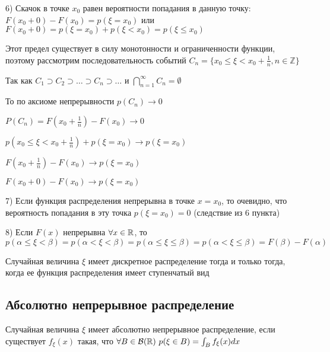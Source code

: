 \documentclass[12pt]{article}
\begin{document}
    6) Скачок в точке $x_0$ равен вероятности попадания в данную точку: $F(x_0 + 0) - F(x_0) = p(\xi = x_0)$ или $F(x_0 + 0) = p(\xi = x_0) + p(\xi < x_0) = p(\xi \leq x_0)$

    
    \begin{MyProof}
        Этот предел существует в силу монотонности и ограниченности функции, поэтому рассмотрим последовательность событий $C_n = \{x_0 \leq \xi < x_0 + \frac{1}{n}, n \in \mathbb{Z}\}$

        Так как $C_1 \supset C_2 \supset \dots \supset C_n \supset \dots$ и $\bigcap_{n = 1}^\infty C_n = \emptyset$

        То по аксиоме непрерывности $p(C_n) \to 0$

        $P(C_n) = F(x_0 + \frac{1}{n}) - F(x_0) \rightarrow 0$

        $p(x_0 \leq \xi < x_0 + \frac{1}{n}) + p(\xi = x_0) \rightarrow p(\xi = x_0)$

        $F(x_0 + \frac{1}{n}) - F(x_0) \to p(\xi = x_0)$

        $F(x_0 + 0) - F(x_0) \to p(\xi = x_0)$
    \end{MyProof}
    
    7) Если функция распределения непрерывна в точке $x = x_0$, то очевидно, что вероятность попадания в эту точка $p(\xi = x_0) = 0$ (следствие из 6 пункта)
    
    8) Если $F(x)$ непрерывна $\forall x \in \mathbb{R}$, то $p(\alpha \leq \xi < \beta) = p(\alpha < \xi < \beta) = p(\alpha \leq \xi \leq \beta) = p(\alpha < \xi \leq \beta) = F(\beta) - F(\alpha)$
    
    \begin{MyTheorem}
        \Ths Случайная величина $\xi$ имеет дискретное распределение тогда и только тогда, когда ее функция распределения имеет ступенчатый вид
    \end{MyTheorem}

    \hypertarget{continuousdistributionproperties}{}

    \subsection{Абсолютно непрерывное распределение}

    \Def Случайная величина $\xi$ имеет абсолютно непрерывное распределение, если существует $f_\xi(x)$ такая, что $\forall B \in \mathcal{B}(\mathbb{R})
    \ p(\xi \in B) = \int_B f_\xi(x)dx$

    \hypertarget{densityfunctiondefinition}{}
\end{document}
